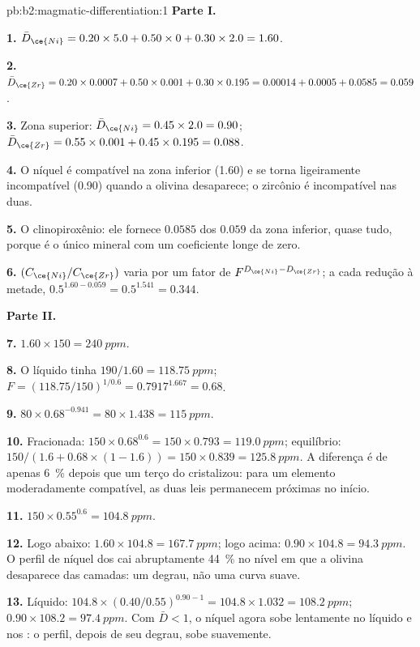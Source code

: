 \begin{solution}{pb:b2:magmatic-differentiation:1}
\noindent\textbf{Parte I.}

\textbf{1.} $\bar D_{\ce{Ni}} = 0.20\times5.0 + 0.50\times0 + 0.30\times2.0 = 1.60$.

\textbf{2.} $\bar D_{\ce{Zr}} = 0.20\times0.0007 + 0.50\times0.001 + 0.30\times0.195 =
0.00014 + 0.0005 + 0.0585 = 0.059$.

\textbf{3.} Zona superior: $\bar D_{\ce{Ni}} = 0.45\times2.0 = 0.90$; $\bar D_{\ce{Zr}} =
0.55\times0.001 + 0.45\times0.195 = 0.088$.

\textbf{4.} O níquel é compatível na zona inferior (1.60) e se torna ligeiramente
incompatível (0.90) quando a olivina desaparece; o zircônio é incompatível nas duas.

\textbf{5.} O clinopiroxênio: ele fornece $0.0585$ dos $0.059$ da zona inferior, quase
tudo, porque é o único mineral com um coeficiente longe de zero.

\textbf{6.} $(C_{\ce{Ni}}/C_{\ce{Zr}})$ varia por um fator de $F^{D_{\ce{Ni}} - D_{\ce{Zr}}}$;
a cada redução à metade, $0.5^{1.60 - 0.059} = 0.5^{1.541} = 0.344$.

\noindent\textbf{Parte II.}

\textbf{7.} $1.60\times150 = \qty{240}{ppm}$.

\textbf{8.} O líquido tinha $190/1.60 = \qty{118.75}{ppm}$; $F = (118.75/150)^{1/0.6} =
0.7917^{1.667} = 0.68$.

\textbf{9.} $80\times0.68^{-0.941} = 80\times1.438 = \qty{115}{ppm}$.

\textbf{10.} Fracionada: $150\times0.68^{0.6} = 150\times0.793 = \qty{119.0}{ppm}$;
equilíbrio: $150/(1.6 + 0.68\times(1 - 1.6)) = 150\times0.839 = \qty{125.8}{ppm}$.
A diferença é de apenas \qty{6}{\percent} depois que um terço do 
cristalizou: para um elemento moderadamente compatível, as duas leis permanecem próximas no início.

\textbf{11.} $150\times0.55^{0.6} = \qty{104.8}{ppm}$.

\textbf{12.} Logo abaixo: $1.60\times104.8 = \qty{167.7}{ppm}$; logo acima:
$0.90\times104.8 = \qty{94.3}{ppm}$. O perfil de níquel dos  cai
abruptamente \qty{44}{\percent} no nível em que a olivina desaparece das
camadas: um degrau, não uma curva suave.

\textbf{13.} Líquido: $104.8\times(0.40/0.55)^{0.90 - 1} = 104.8\times1.032 =
\qty{108.2}{ppm}$;  $0.90\times108.2 = \qty{97.4}{ppm}$. Com $\bar D < 1$,
o níquel agora sobe lentamente no líquido e nos : o perfil, depois de seu
degrau, sobe suavemente.


\end{solution}
